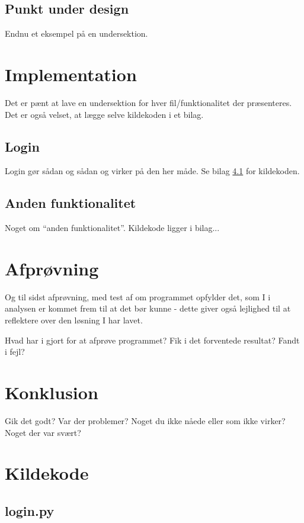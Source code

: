 \documentclass[10pt,a4paper,danish]{article}
\begin{document}
\subsection{Punkt under design}
Endnu et eksempel på en undersektion.


\section{Implementation}
Det er pænt at lave en undersektion for hver fil/funktionalitet der
præsenteres. Det er også velset, at lægge selve kildekoden i et bilag.

\subsection{Login}
Login gør sådan og sådan og virker på den her måde.
Se bilag \ref{login.py} for kildekoden.

\subsection{Anden funktionalitet}
Noget om "`anden funktionalitet"'. Kildekode ligger i bilag...


\section{Afprøvning}
Og til sidst afprøvning, med test af om
programmet opfylder det, som I i analysen er kommet frem til at det
bør kunne - dette giver også lejlighed til at reflektere over den
løsning I har lavet.

Hvad har i gjort for at afprøve programmet? Fik i det forventede
resultat? Fandt i fejl?


\section{Konklusion}
Gik det godt? Var der problemer? Noget du ikke nåede eller som ikke
virker? Noget der var svært?


\appendix


\section{Kildekode}
\subsection{login.py}
\label{login.py} %


\end{document}
